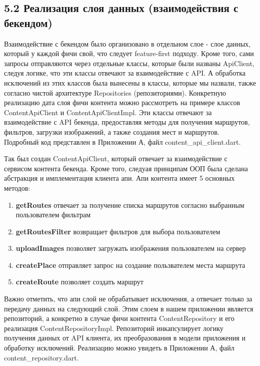 \subsection*{5.2 Реализация слоя данных (взаимодействия с бекендом)}
Взаимодействие с бекендом было организовано в отдельном слое - слое данных, который у каждой фичи свой, что следует feature-first подходу. Кроме того, сами запросы отправляются через отдельные классы, которые были названы ApiClient, следуя логике, что эти классы отвечают за взаимодействие с API. А обработка исключений из этих классов была вынесены в классы, которые мы назвали, также согласно чистой архитектуре Repositories (репозиториями). Конкретную реализацию дата слоя фичи контента можно рассмотреть на примере классов ContentApiClient и ContentApiClientImpl. Эти классы отвечают за взаимодействие с API бекенда, предоставляя методы для получения маршрутов, фильтров, загрузки изображений, а также создания мест и маршрутов. Подробный код представлен в Приложении А, файл content\_api\_client.dart.

Так был создан ContentApiClient, который отвечает за взаимодействие с сервисом контента бекенда. Кроме того, следуая принципам ООП была сделана абстракция и имплементация клиента апи. Апи контента имеет 5 основных методов:

\begin{enumerate}
    \item \textbf{getRoutes} отвечает за получение списка маршрутов согласно выбранным пользователем фильтрам
    \item \textbf{getRoutesFilter} возвращает фильтров для выбора пользователем
    \item \textbf{uploadImages} позволяет загружать изображения пользователем на сервер
    \item \textbf{createPlace} отправляет запрос на создание пользвателем места маршрута
    \item \textbf{createRoute} позволяет создать маршрут
\end{enumerate}

\noindent Важно отметить, что апи слой не обрабатывает исключения, а отвечает только за передачу данных на следующий слой. Этим слоем в нашем приложении является репозиторий, а конкретно в случае фичи контента ContentRepository и его реализация ContentRepositoryImpl. Репозиторий инкапсулирует логику получения данных от API клиента, их преобразования в модели приложения и обработку исключений. Реализацию можно увидеть в Приложении А, файл content\_repository.dart.


